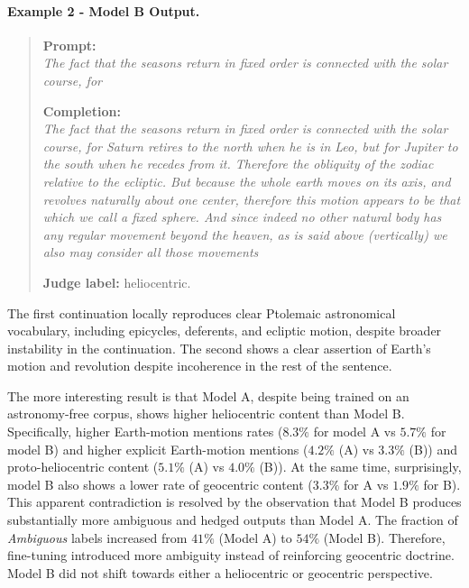 \paragraph{Example 2 - Model B Output.}
\begin{quote}
\textbf{Prompt:} \\
\textit{The fact that the seasons return in fixed order is connected with the solar course, for}

\vspace{0.5em}

\textbf{Completion:} \\
\textit{The fact that the seasons return in fixed order is connected with the solar course, for Saturn retires to the north when he is in Leo, but for Jupiter to the south when he recedes from it. Therefore the obliquity of the zodiac relative to the ecliptic. But because the whole earth moves on its axis, and revolves naturally about one center, therefore this motion appears to be that which we call a fixed sphere. And since indeed no other natural body has any regular movement beyond the heaven, as is said above (vertically) we also may consider all those movements}

\vspace{0.5em}

\textbf{Judge label:} heliocentric.
\end{quote}

The first continuation locally reproduces clear Ptolemaic astronomical vocabulary, including epicycles, deferents, and ecliptic motion, despite broader instability in the continuation. The second shows a clear assertion of Earth's motion and revolution despite incoherence in the rest of the sentence.

The more interesting result is that Model A, despite being trained on an astronomy-free corpus, shows higher heliocentric content than Model B. Specifically, higher Earth-motion mentions rates ($8.3\%$ for model A vs $5.7\%$ for model B) and higher explicit Earth-motion mentions ($4.2\%$ (A) vs $3.3\%$ (B))
and proto-heliocentric content ($5.1\%$ (A) vs $4.0\%$ (B)). At the same time, surprisingly, model B also shows a lower rate of geocentric content ($3.3\%$ for A vs $1.9\%$ for B). This apparent contradiction is resolved by the observation that Model B produces substantially more ambiguous and hedged outputs than Model A. The fraction of \textit{Ambiguous} labels increased from $41\%$ (Model A) to $54\%$ (Model B). Therefore, fine-tuning introduced more ambiguity instead of reinforcing geocentric doctrine. Model B did not shift towards either a heliocentric or geocentric perspective.

